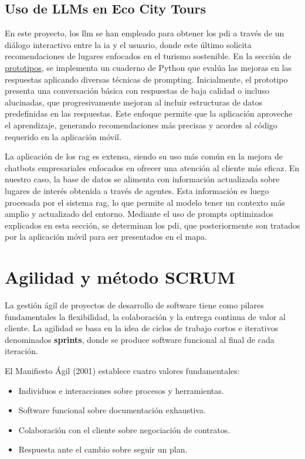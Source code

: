 	
	\subsection{Uso de LLMs en Eco City Tours}
	En este proyecto, los \acrlong{llm} se han empleado para obtener los \acrfull{pdi} a través de un diálogo interactivo entre la \acrlong{ia} y el usuario, donde este último solicita recomendaciones de lugares enfocados en el turismo sostenible. En la sección de \href{https://github.com/fps1001/TFGII_FPisot/tree/main/project-prototypes/README.md}{prototipos}, se implementa un cuaderno de Python que evalúa las mejoras en las respuestas aplicando diversas técnicas de prompting\cite{promptingguide}. Inicialmente, el prototipo presenta una conversación básica con respuestas de baja calidad o incluso alucinadas, que progresivamente mejoran al incluir estructuras de datos predefinidas en las respuestas. Este enfoque permite que la aplicación aproveche el aprendizaje, generando recomendaciones más precisas y acordes al código requerido en la aplicación móvil.
	
	La aplicación de los \acrfull{rag} es extensa, siendo su uso más común en la mejora de chatbots empresariales enfocados en ofrecer una atención al cliente más eficaz. En nuestro caso, la base de datos se alimenta con información actualizada sobre lugares de interés obtenida a través de agentes. Esta información es luego procesada por el sistema \acrshort{rag}, lo que permite al modelo tener un contexto más amplio y actualizado del entorno. Mediante el uso de prompts optimizados explicados en esta sección, se determinan los \acrlong{pdi}, que posteriormente son tratados por la aplicación móvil para ser presentados en el mapa.

\section{Agilidad y método SCRUM}
La gestión ágil de proyectos de desarrollo de software tiene como pilares fundamentales la flexibilidad, la colaboración y la entrega continua de valor al cliente\cite{agile_alliance}. La agilidad se basa en la idea de ciclos de trabajo cortos e iterativos denominados \textbf{sprints}, donde se produce software funcional al final de cada iteración.

El Manifiesto Ágil (2001) establece cuatro valores fundamentales:
\begin{itemize}
\item Individuos e interacciones sobre procesos y herramientas.
\item Software funcional sobre documentación exhaustiva.
\item Colaboración con el cliente sobre negociación de contratos.
\item Respuesta ante el cambio sobre seguir un plan.
\end{itemize}

